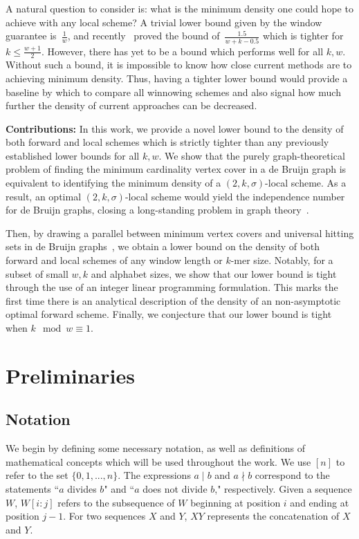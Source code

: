 \documentclass{article}
\newcommand{\kmer}{{$k$-mer}}
\begin{document}
A natural question to consider is: what is the minimum density one could hope to achieve with any local scheme? A trivial lower bound given by the window guarantee is~$\frac{1}{w}$, and recently~\cite{groot2024mod} proved the bound of~$\frac{1.5}{w+k-0.5}$ which is tighter for $k\leq \frac{w+1}{2}$. However, there has yet to be a bound which performs well for all $k,w$. Without such a bound, it is impossible to know how close current methods are to achieving minimum density. Thus, having a tighter lower bound would provide a baseline by which to compare all winnowing schemes and also signal how much further the density of current approaches can be decreased. 

\textbf{Contributions:} In this work, we provide a novel lower bound to the density of both forward and local schemes which is strictly tighter than any previously established lower bounds for all $k,w$. We show that the purely graph-theoretical problem of finding the minimum cardinality vertex cover in a de Bruijn graph is equivalent to identifying the minimum density of a $(2, k, \sigma)$-local scheme. As a result, an optimal $(2, k, \sigma)$-local scheme would yield the independence number for de Bruijn graphs, closing a long-standing problem in graph theory~\citep{bryant1991covering, lichiardopol2006independence, cartwright2009maximum}. 

Then, by drawing a parallel between minimum vertex covers and universal hitting sets in de Bruijn graphs~\citep{zheng2021lower}, we obtain a lower bound on the density of both forward and local schemes of any window length or \kmer{} size. Notably, for a subset of small $w, k$ and alphabet sizes, we show that our lower bound is tight through the use of an integer linear programming formulation. This marks the first time there is an analytical description of the density of an non-asymptotic optimal forward scheme. Finally, we conjecture that our lower bound is tight when $k\mod w \equiv 1$. 

\section{Preliminaries}
\subsection{Notation}
We begin by defining some necessary notation, as well as definitions of mathematical concepts which will be used throughout the work. We use $[n]$ to refer to the set $\{0, 1,...,n\}$. The expressions $a\mid b$ and $a\nmid b$ correspond to the statements ``$a$ divides $b$" and ``$a$ does not divide $b$," respectively. Given a sequence $W$, $W[i:j]$ refers to the subsequence of $W$ beginning at position $i$ and ending at position $j-1$. For two sequences $X$ and $Y$, $XY$ represents the concatenation of $X$ and $Y$.
\end{document}
